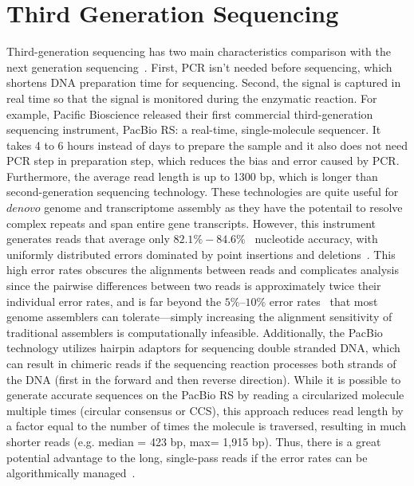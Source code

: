 \section{Third Generation Sequencing}
Third-generation sequencing has two main characteristics comparison with the next generation sequencing~\cite{pmid22829749}. First, PCR isn't needed before sequencing, which shortens DNA preparation time for sequencing. Second, the signal is captured in real time so that the signal is monitored during the enzymatic reaction. For example, Pacific Bioscience released their first commercial third-generation sequencing instrument, PacBio RS: a real-time, single-molecule sequencer. It takes 4 to 6 hours instead of days to prepare the sample and it also does not need PCR step in preparation step, which reduces the bias and error caused by PCR. Furthermore, the average read length is up to 1300 bp, which is longer than second-generation sequencing technology. These technologies are quite useful for $de novo$ genome and transcriptome assembly as they have the potentail to resolve complex repeats and span entire gene transcripts. However, this instrument generates reads that average only $82.1\%-84.6\%$~\cite{pmid21142692, pmid21793740} nucleotide accuracy, with uniformly distributed errors dominated by point insertions and deletions~\cite{Koren2012}. This high error rates obscures the alignments between reads and complicates analysis since the pairwise differences between two reads is approximately twice their individual error rates, and is far beyond the $5\%–10\%$ error rates~\cite{Marcel2005, pmid18952627, pmid22147368} that most genome assemblers can tolerate—simply increasing the alignment sensitivity of traditional assemblers is computationally infeasible. Additionally, the PacBio technology utilizes hairpin adaptors for sequencing double stranded DNA, which can result in chimeric reads if the sequencing reaction processes both strands of the DNA (first in the forward and then reverse direction). While it is possible to generate accurate sequences on the PacBio RS by reading a circularized molecule multiple times (circular consensus or CCS), this approach reduces read length by a factor equal to the number of times the molecule is traversed, resulting in much shorter reads (e.g. median = 423 bp, max= 1,915 bp). Thus, there is a great potential advantage to the long, single-pass reads if the error rates can be algorithmically managed~\cite{Koren2012}.


